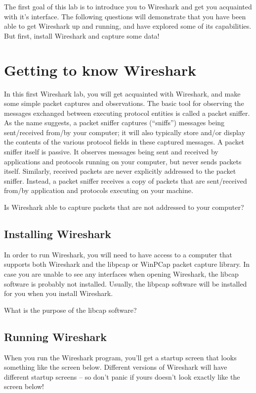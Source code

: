 \documentclass[11pt,a4paper]{article}
\begin{document}
The first goal of this lab is to introduce you to Wireshark and get you acquainted with it's interface. The following questions will demonstrate that you have been able to get Wireshark up and running, and have explored some of its capabilities.
But first, install Wireshark and capture some data!

\section{Getting to know Wireshark}
In this first Wireshark lab, you will get acquainted with Wireshark, and make some simple packet captures and observations.
The basic tool for observing the messages exchanged between executing protocol entities is called a packet sniffer. As the name suggests, a packet sniffer captures (``sniffs'') messages being sent/received from/by your computer; it will also typically store and/or display the contents of the various protocol fields in these captured messages. A packet sniffer itself is passive. It observes messages being sent and received by applications and protocols running on your computer, but never sends packets itself. Similarly, received packets are never explicitly addressed to the packet sniffer. Instead, a packet sniffer receives a copy of packets that are sent/received from/by application and protocols executing on your machine.

\begin{question}
    Is Wireshark able to capture packets that are not addressed to your computer?
\end{question}

\subsection{Installing Wireshark}
In order to run Wireshark, you will need to have access to a computer that supports both Wireshark and the libpcap or WinPCap packet capture library. 
In case you are unable to see any interfaces when opening Wireshark, the libcap software is probably not installed. Usually, the libpcap software will be installed for you when you install Wireshark.

\begin{question}
    What is the purpose of the libcap software?
\end{question}

\subsection{Running Wireshark}
When you run the Wireshark program, you'll get a startup screen that looks something
like the screen below. Different versions of Wireshark will have different startup screens
-- so don't panic if yours doesn't look exactly like the screen below!
\end{document}
